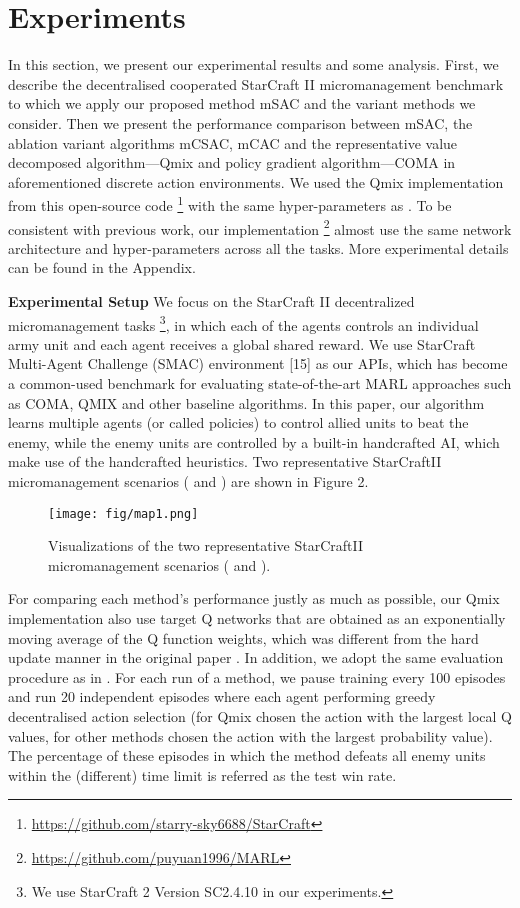 \documentclass[runningheads]{llncs}
\begin{document}
\section{Experiments}
In this section, we present our experimental results and some analysis.  First, we describe the decentralised cooperated StarCraft II micromanagement benchmark to which we apply our proposed method mSAC and the variant methods we consider. Then we present the performance comparison between mSAC, the ablation variant algorithms mCSAC, mCAC and the representative value decomposed algorithm---Qmix and policy gradient algorithm---COMA   
in aforementioned discrete action environments. 
We used the Qmix implementation from this open-source code \footnote{\url{https://github.com/starry-sky6688/StarCraft}} with the same hyper-parameters as \cite{b7}. 
To be consistent with previous work, our implementation \footnote{\url{https://github.com/puyuan1996/MARL}} 
almost use the same network architecture and hyper-parameters across all the tasks.
 More experimental details can be found in the Appendix.


{\bf Experimental Setup}
We focus on the StarCraft II decentralized micromanagement tasks \cite{b13} \footnote{We use StarCraft 2 Version SC2.4.10 in our experiments.}, in which each of the agents controls an individual army unit and each agent receives a global shared reward. We use StarCraft Multi-Agent Challenge (SMAC) environment [15] as our APIs, which has become
a common-used benchmark for evaluating state-of-the-art MARL approaches such as COMA, QMIX and other baseline algorithms. In this paper, our algorithm learns multiple agents (or called policies) to control allied units to beat the
enemy, while the enemy units are controlled by a built-in handcrafted AI, which make use of the handcrafted heuristics. 
Two representative StarCraftII micromanagement
scenarios ( and ) are shown in Figure 2.
\begin{figure}[h]
	\centering
	\texttt{[image: fig/map1.png]} 
\caption{Visualizations of the two representative StarCraftII micromanagement scenarios ( and ).}
	\label{wolf2}
\end{figure}













For comparing each method’s performance justly as much as possible, our Qmix implementation also use target Q networks that are obtained as an exponentially moving average of the Q function weights, which was different from the hard update manner in the original paper \cite{b7}. 
In addition, we adopt the same evaluation procedure as in  \cite{b7}. For each run of a method, we pause training every 100 episodes and run 20 independent episodes where each agent performing greedy decentralised action selection (for Qmix chosen the action with the largest local Q values, for other methods chosen the action with the largest probability value). The percentage of these episodes in which the method defeats all enemy units within the (different) time limit is referred as the test win rate.
\end{document}
